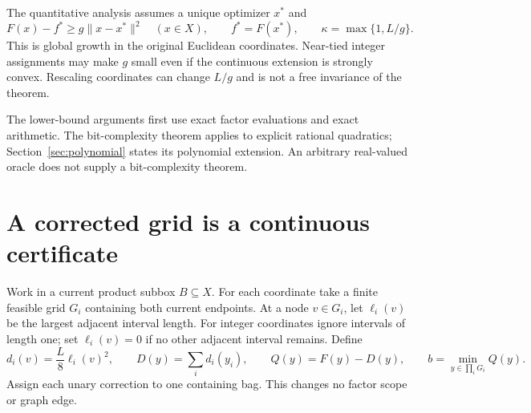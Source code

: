 \documentclass[11pt]{article}
\theoremstyle{remark}
\newcommand{\norm}[1]{\lVert#1\rVert}
\newcommand{\OPT}{f^*}
\begin{document}
The quantitative analysis assumes a unique optimizer $x^*$ and
\begin{equation}\label{eq:growth}
F(x)-\OPT\ge g\norm{x-x^*}^2\quad(x\in X),\qquad
\OPT=F(x^*),\qquad \kappa=\max\{1,L/g\}.
\end{equation}
This is global growth in the original Euclidean coordinates. Near-tied
integer assignments may make $g$ small even if the continuous extension is
strongly convex. Rescaling coordinates can change $L/g$ and is not a
free invariance of the theorem.

The lower-bound arguments first use exact factor evaluations and exact
arithmetic. The bit-complexity theorem applies to explicit rational
quadratics; Section~\ref{sec:polynomial} states its polynomial extension.
An arbitrary real-valued oracle does not supply a bit-complexity theorem.

\section{A corrected grid is a continuous certificate}\label{sec:bound}

Work in a current product subbox $B\subseteq X$. For each coordinate take
a finite feasible grid $G_i$ containing both current endpoints. At a node
$v\in G_i$, let $\ell_i(v)$ be the largest adjacent interval length.
For integer coordinates ignore intervals of length one; set $\ell_i(v)=0$
if no other adjacent interval remains. Define
\begin{equation}\label{eq:correction}
d_i(v)=\frac L8\ell_i(v)^2,\qquad
D(y)=\sum_i d_i(y_i),\qquad Q(y)=F(y)-D(y),\qquad
b=\min_{y\in\prod_iG_i}Q(y).
\end{equation}
Assign each unary correction to one containing bag. This changes no
factor scope or graph edge.
\end{document}
